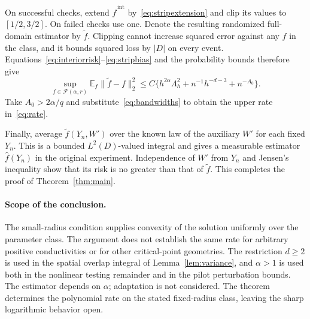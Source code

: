 \documentclass[11pt]{article}
\theoremstyle{remark}
\newcommand{\E}{\mathbb E}
\newcommand{\cF}{\mathcal F}
\newcommand{\norm}[1]{\lVert #1\rVert}
\newcommand{\abs}[1]{\lvert #1\rvert}
\begin{document}
On successful checks, extend $\widehat f^{\,\mathrm{int}}$ by~\eqref{eq:stripextension} and clip its values to $[1/2,3/2]$. On failed checks use one. Denote the resulting randomized full-domain estimator by $\widetilde f$. Clipping cannot increase squared error against any $f$ in the class, and it bounds squared loss by $\abs D$ on every event. Equations~\eqref{eq:interiorrisk}--\eqref{eq:stripbias} and the probability bounds therefore give
\begin{equation}\label{eq:fullrisk}
 \sup_{f\in\cF(\alpha,r)}\E_f\norm{\widetilde f-f}_2^2
 \le C\{h^{2\alpha}\Lambda_h^2+n^{-1}h^{-d-3}+n^{-A_0}\}.
\end{equation}
Take $A_0>2\alpha/q$ and substitute~\eqref{eq:bandwidths} to obtain the upper rate in~\eqref{eq:rate}.

Finally, average $\widetilde f(Y_n,W')$ over the known law of the auxiliary $W'$ for each fixed $Y_n$. This is a bounded $L^2(D)$-valued integral and gives a measurable estimator $\widehat f(Y_n)$ in the original experiment. Independence of $W'$ from $Y_n$ and Jensen's inequality show that its risk is no greater than that of $\widetilde f$. This completes the proof of Theorem~\ref{thm:main}.

\paragraph{Scope of the conclusion.}
The small-radius condition supplies convexity of the solution uniformly over the parameter class. The argument does not establish the same rate for arbitrary positive conductivities or for other critical-point geometries. The restriction $d\ge2$ is used in the spatial overlap integral of Lemma~\ref{lem:variance}, and $\alpha>1$ is used both in the nonlinear testing remainder and in the pilot perturbation bounds. The estimator depends on $\alpha$; adaptation is not considered. The theorem determines the polynomial rate on the stated fixed-radius class, leaving the sharp logarithmic behavior open.
\end{document}
